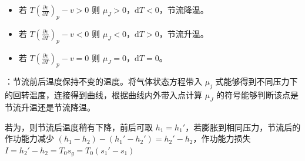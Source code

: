 \begin{itemize}
    \item 若 $T\left(\frac{\partial v}{\partial T}\right)_p-v>0$ 则 $\mu_J>0$，$\mathrm{d}T<0$，节流降温。
    \item 若 $T\left(\frac{\partial v}{\partial T}\right)_p-v<0$ 则 $\mu_J<0$，$\mathrm{d}T>0$，节流升温。
    \item 若 $T\left(\frac{\partial v}{\partial T}\right)_p-v=0$ 则 $\mu_J=0$，$\mathrm{d}T=0$。
\end{itemize}

：节流前后温度保持不变的温度。将气体状态方程带入 $\mu_j$ 式能够得到不同压力下的回转温度，连接得到曲线，根据曲线内外带入点计算 $\mu_J$ 的符号能够判断该点是节流升温还是节流降温。

若为，则节流后温度稍有下降，前后可取 $h_1=h_1'$，若膨胀到相同压力，节流后的作功能力减少 $(h_1-h_2)-(h_1'-h_2')=h_2'-h_2$，作功能力损失 $I=h_2'-h_2=T_0s_g=T_0(s_1'-s_1)$

\divider